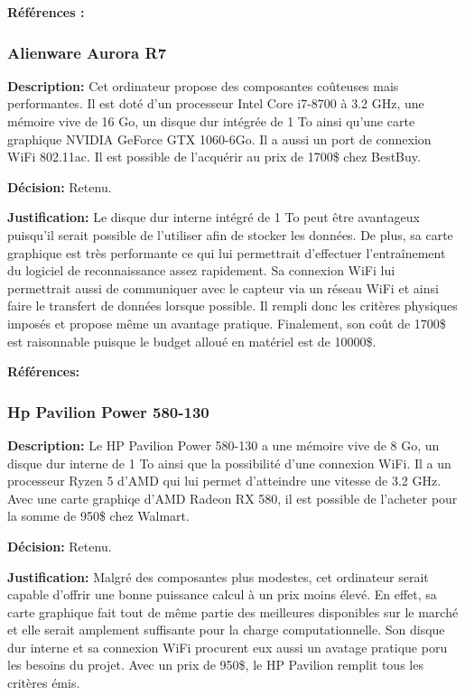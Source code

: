 \textbf{Références :} \cite{Raspberry_Pi_Specs}
 
 
\subsubsection{Alienware Aurora R7}

\textbf{Description:} Cet ordinateur propose des composantes coûteuses mais performantes. Il est doté d'un processeur Intel Core i7-8700 à 3.2 GHz, une mémoire vive de 16 Go, un disque dur intégrée de 1 To ainsi qu'une carte graphique NVIDIA GeForce GTX 1060-6Go. Il a aussi un port de connexion WiFi 802.11ac. Il est possible de l'acquérir au prix de 1700\$ chez BestBuy.

\textbf{Décision:} Retenu.

\textbf{Justification:} Le disque dur interne intégré de 1 To peut être avantageux puisqu'il serait possible de l'utiliser afin de stocker les données. De plus, sa carte graphique est très performante ce qui lui permettrait d'effectuer l'entraînement du logiciel de reconnaissance assez rapidement. Sa connexion WiFi lui permettrait aussi de communiquer avec le capteur via un réseau WiFi et ainsi faire le transfert de données lorsque possible. Il rempli donc les critères physiques imposés et propose même un avantage pratique. Finalement, son coût de 1700\$ est raisonnable puisque le budget alloué en matériel est de 10000\$.

\textbf{Références:} \cite{User_Benchmark_score} \cite{Alienware_R7} 


\subsubsection{Hp Pavilion Power 580-130}

\textbf{Description:} Le HP Pavilion Power 580-130 a une mémoire vive de 8 Go, un disque dur interne de 1 To ainsi que la possibilité d'une connexion WiFi. Il a un processeur Ryzen 5 d'AMD qui lui permet d'atteindre une vitesse de 3.2 GHz. Avec une carte graphiqe d'AMD Radeon RX 580, il est possible de l'acheter pour la somme de 950\$ chez Walmart.

\textbf{Décision:} Retenu.

\textbf{Justification:} Malgré des composantes plus modestes, cet ordinateur serait capable d'offrir une bonne puissance calcul à un prix moins élevé. En effet, sa carte graphique fait tout de même partie des meilleures disponibles sur le marché et elle serait amplement suffisante pour la charge computationnelle. Son disque dur interne et sa connexion WiFi procurent eux aussi un avatage pratique poru les besoins du projet. Avec un prix de 950\$, le HP Pavilion remplit tous les critères émis.

